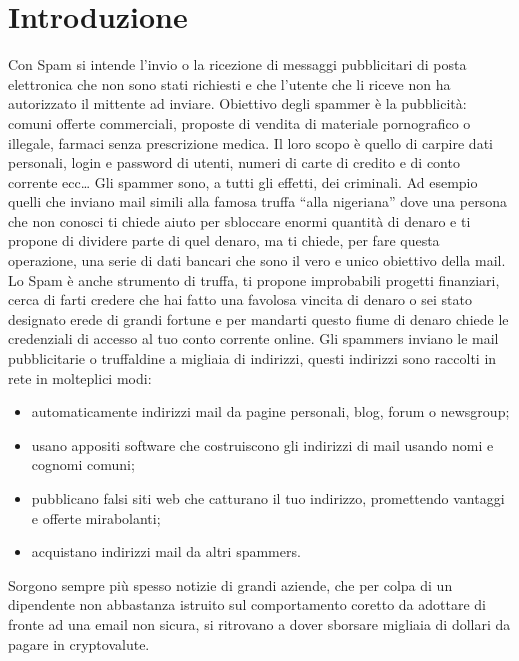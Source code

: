 \documentclass[12pt,a4paper]{article}
\begin{document}
\section{Introduzione}
Con Spam si intende l’invio o la ricezione di messaggi pubblicitari di posta elettronica che non sono stati richiesti e che l’utente che li riceve non ha autorizzato il mittente ad inviare.
\hfill \break \break
Obiettivo degli spammer è la pubblicità: comuni offerte commerciali, proposte di vendita di materiale pornografico o illegale, farmaci senza prescrizione medica. Il loro scopo è quello di carpire dati personali, login e password di utenti, numeri di carte di credito e di conto corrente ecc…
\hfill \break \break
Gli spammer sono, a tutti gli effetti, dei criminali. Ad esempio quelli che inviano mail simili alla famosa truffa “alla nigeriana” dove una persona che non conosci ti chiede aiuto per sbloccare enormi  quantità di denaro e ti propone di dividere parte di quel denaro, ma ti chiede, per fare questa operazione, una serie di dati bancari che sono il vero e unico obiettivo della mail.
\hfill \break \break
Lo Spam è anche strumento di truffa, ti propone improbabili progetti finanziari, cerca di farti credere che hai fatto una favolosa vincita di denaro o sei stato designato erede di grandi fortune e per mandarti questo fiume di denaro chiede  le credenziali di accesso al tuo conto corrente online.
\hfill \break \break
Gli spammers inviano le mail pubblicitarie o truffaldine a migliaia di indirizzi, questi indirizzi sono raccolti in rete in molteplici modi:
\begin{itemize}
    \item automaticamente indirizzi mail da pagine personali, blog, forum o newsgroup;
\end{itemize}
\begin{itemize}
    \item usano appositi software che costruiscono gli indirizzi di mail usando nomi e cognomi comuni;
\end{itemize}
\begin{itemize}
    \item pubblicano falsi siti web che catturano il tuo indirizzo, promettendo vantaggi e offerte mirabolanti;
\end{itemize}
\begin{itemize}
    \item acquistano indirizzi mail da altri spammers.
\end{itemize}

Sorgono sempre più spesso notizie di grandi aziende, che per colpa di un dipendente non abbastanza istruito sul comportamento coretto da adottare di fronte ad una email non sicura, si ritrovano a dover sborsare migliaia di dollari da pagare in cryptovalute.
\end{document}
